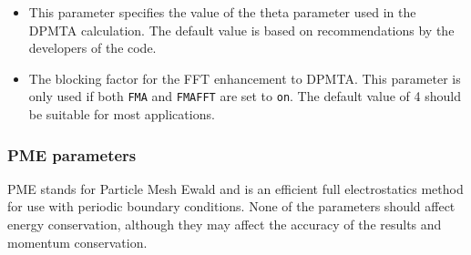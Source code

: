 \begin{itemize}

\item
{}
{This parameter specifies the value of the theta parameter
used in the DPMTA calculation.  The default value is based on
recommendations by the developers of the code.}

\item
{}
{The blocking factor for the FFT enhancement to DPMTA.
This parameter is only used if both {\tt FMA} and {\tt FMAFFT} 
are set to {\tt on}.  The default value of 4 should be suitable
for most applications.}

\end{itemize}

\subsubsection{PME parameters}

PME stands for Particle Mesh Ewald and is an efficient
full electrostatics method for use with periodic boundary conditions.
None of the parameters should affect energy conservation, although they may affect the accuracy of the results and momentum conservation.

